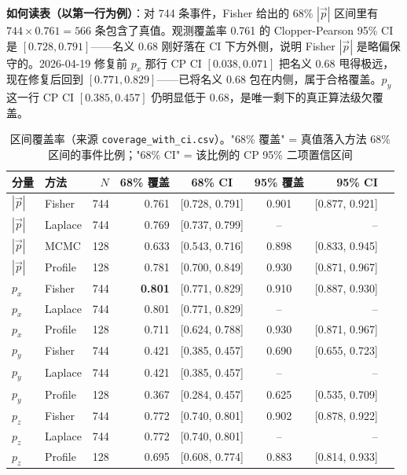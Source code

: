 \documentclass[a4paper, 11pt]{article}
\begin{document}
\textbf{如何读表（以第一行为例）}：对 744 条事件，Fisher 给出的 68\% $|\vec p|$ 区间里有 $744\times 0.761=566$ 条包含了真值。观测覆盖率 0.761 的 Clopper-Pearson 95\% CI 是 $[0.728, 0.791]$——名义 0.68 刚好落在 CI 下方外侧，说明 Fisher $|\vec p|$ 是略偏保守的。2026-04-19 修复前 $p_x$ 那行 CP CI $[0.038, 0.071]$ 把名义 0.68 甩得极远，现在修复后回到 $[0.771, 0.829]$——已将名义 0.68 包在内侧，属于合格覆盖。$p_y$ 这一行 CP CI $[0.385, 0.457]$ 仍明显低于 0.68，是唯一剩下的真正算法级欠覆盖。

\begin{table}[H]
\centering\scriptsize
\caption{区间覆盖率（来源 \texttt{coverage\_with\_ci.csv}）。"68\% 覆盖" = 真值落入方法 68\% 区间的事件比例；"68\% CI" = 该比例的 CP 95\% 二项置信区间}
\begin{tabular}{llrrccrr}
\toprule
分量 & 方法 & $N$ & 68\% 覆盖 & 68\% CI & 95\% 覆盖 & 95\% CI \\
\midrule
$|\vec{p}|$ & Fisher  & 744 & 0.761 & [0.728, 0.791] & 0.901 & [0.877, 0.921] \\
$|\vec{p}|$ & Laplace & 744 & 0.769 & [0.737, 0.799] & --    & --              \\
$|\vec{p}|$ & MCMC    & 128 & 0.633 & [0.543, 0.716] & 0.898 & [0.833, 0.945] \\
$|\vec{p}|$ & Profile & 128 & 0.781 & [0.700, 0.849] & 0.930 & [0.871, 0.967] \\
\midrule
$p_x$ & Fisher  & 744 & \textbf{0.801} & [0.771, 0.829] & 0.910 & [0.887, 0.930] \\
$p_x$ & Laplace & 744 & 0.801 & [0.771, 0.829] & --    & --              \\
$p_x$ & Profile & 128 & 0.711 & [0.624, 0.788] & 0.930 & [0.871, 0.967] \\
\midrule
$p_y$ & Fisher  & 744 & 0.421 & [0.385, 0.457] & 0.690 & [0.655, 0.723] \\
$p_y$ & Laplace & 744 & 0.421 & [0.385, 0.457] & --    & --              \\
$p_y$ & Profile & 128 & 0.367 & [0.284, 0.457] & 0.625 & [0.535, 0.709] \\
\midrule
$p_z$ & Fisher  & 744 & 0.772 & [0.740, 0.801] & 0.902 & [0.878, 0.922] \\
$p_z$ & Laplace & 744 & 0.772 & [0.740, 0.801] & --    & --              \\
$p_z$ & Profile & 128 & 0.695 & [0.608, 0.774] & 0.883 & [0.814, 0.933] \\
\bottomrule
\end{tabular}
\end{table}
\end{document}
